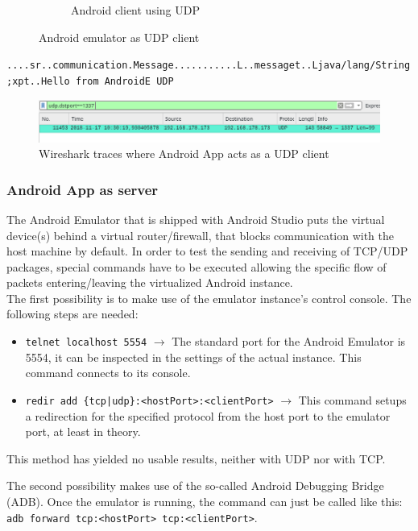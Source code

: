 \begin{figure}[H]
\begin{subfigure}{.49\textwidth}
		\caption{Android client using UDP}
	\end{subfigure}%
	\caption{Android emulator as UDP client}
\end{figure}

\texttt{....sr..communication.Message...........L..messaget..Ljava/lang/String;xpt..Hello from AndroidE UDP}
\begin{figure}[H]
	\includegraphics[width=1\linewidth]{images/task3/subtask1/wiresharkUDP.png}
	\caption{Wireshark traces where Android App acts as a UDP client}
\end{figure}

\subsubsection{Android App as server}

The Android Emulator that is shipped with Android Studio puts the virtual device(s) behind a virtual router/firewall, that blocks communication with the host machine by default. In order to test the sending and receiving of TCP/UDP packages, special commands have to be executed allowing the specific flow of packets entering/leaving the virtualized Android instance.\\

The first possibility is to make use of the emulator instance's control console. The following steps are needed: 

\begin{itemize}
	\item \texttt{telnet localhost 5554} $\rightarrow$ The standard port for the Android Emulator is 5554, it can be inspected in the settings of the actual instance. This command connects to its console.
	\item \texttt{redir add \{tcp|udp\}:<hostPort>:<clientPort>} $\rightarrow$ This command setups a redirection for the specified protocol from the host port to the emulator port, at least in theory. 
\end{itemize}

This method has yielded no usable results, neither with UDP nor with TCP.

The second possibility makes use of the so-called Android Debugging Bridge (ADB). Once the emulator is running, the command can just be called like this: \texttt{adb forward tcp:<hostPort> tcp:<clientPort>}.


